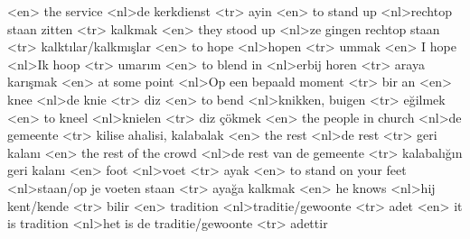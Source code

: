 <en> the service 
<nl>de kerkdienst 
<tr> ayin  
<en> to stand up 
<nl>rechtop staan zitten 
<tr> kalkmak 
<en> they stood up 
<nl>ze gingen rechtop staan 
<tr>  kalktılar/kalkmışlar 
<en> to hope 
<nl>hopen 
<tr> ummak 
<en> I hope 
<nl>Ik hoop 
<tr> umarım 
<en> to blend in  
<nl>erbij horen  
<tr> araya karışmak 
<en> at some point 
<nl>Op een bepaald moment 
<tr>  bir an 
<en> knee 
<nl>de knie 
<tr> diz
<en> to bend 
<nl>knikken, buigen 
<tr> eğilmek 
<en> to kneel 
<nl>knielen 
<tr> diz çökmek 
<en> the people in church 
<nl>de gemeente 
<tr>  kilise ahalisi, kalabalak 
<en> the rest 
<nl>de rest 
<tr> geri kalanı 
<en> the rest of the crowd 
<nl>de rest van de gemeente 
<tr>  kalabalığın geri kalanı
<en> foot 
<nl>voet 
<tr> ayak 
<en> to stand on your feet 
<nl>staan/op je voeten staan 
<tr> ayağa kalkmak 
<en> he knows 
<nl>hij  kent/kende 
<tr> bilir 
<en> tradition 
<nl>traditie/gewoonte
<tr> adet 
<en> it is tradition 
<nl>het is de traditie/gewoonte 
<tr> adettir 
